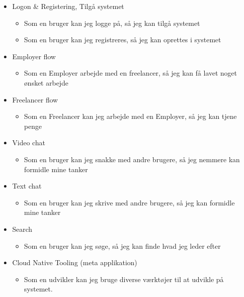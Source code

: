 \begin{itemize}
    \item Logon \& Registering, Tilgå systemet
          \begin{itemize}
              \item Som en bruger kan jeg logge på, så jeg kan tilgå systemet
              \item Som en bruger kan jeg registreres, så jeg kan oprettes i systemet
          \end{itemize}
    \item Employer flow
          \begin{itemize}
              \item Som en Employer arbejde med en freelancer, så jeg kan få lavet noget ønsket arbejde
          \end{itemize}
    \item Freelancer flow
          \begin{itemize}
              \item Som en Freelancer kan jeg arbejde med en Employer, så jeg kan tjene penge
          \end{itemize}
    \item Video chat
          \begin{itemize}
              \item Som en bruger kan jeg snakke med andre brugere, så jeg nemmere kan formidle mine tanker
          \end{itemize}
    \item Text chat
          \begin{itemize}
              \item Som en bruger kan jeg skrive med andre brugere, så jeg kan formidle mine tanker
          \end{itemize}
    \item Search
          \begin{itemize}
              \item Som en bruger kan jeg søge, så jeg kan finde hvad jeg leder efter
          \end{itemize}
    \item Cloud Native Tooling (meta applikation)
          \begin{itemize}
              \item Som en udvikler kan jeg bruge diverse værktøjer til at udvikle på systemet.
          \end{itemize}
\end{itemize}

